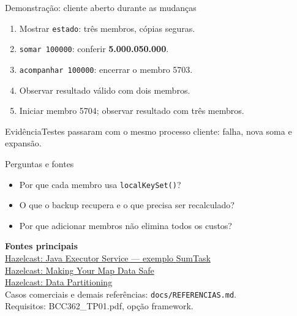 \documentclass[aspectratio=169,11pt]{beamer}
\begin{document}
\begin{frame}{Demonstração: cliente aberto durante as mudanças}
\begin{enumerate}\setlength\itemsep{0.2cm}
\item Mostrar \texttt{estado}: três membros, cópias seguras.
\item \texttt{somar 100000}: conferir \textbf{5.000.050.000}.
\item \texttt{acompanhar 100000}: encerrar o membro 5703.
\item Observar resultado válido com dois membros.
\item Iniciar membro 5704; observar resultado com três membros.
\end{enumerate}
\begin{block}{Evidência}Testes passaram com o mesmo processo cliente: falha, nova soma e expansão.\end{block}
\end{frame}

\begin{frame}{Perguntas e fontes}
\begin{itemize}\setlength\itemsep{0.15cm}
\item Por que cada membro usa \texttt{localKeySet()}?
\item O que o backup recupera e o que precisa ser recalculado?
\item Por que adicionar membros não elimina todos os custos?
\end{itemize}
\vspace{0.3cm}\small\textbf{Fontes principais}\\[0.1cm]
\href{https://docs.hazelcast.com/hazelcast/5.6/computing/executor-service}{Hazelcast: Java Executor Service --- exemplo SumTask}\\
\href{https://docs.hazelcast.com/hazelcast/5.6/data-structures/backing-up-maps}{Hazelcast: Making Your Map Data Safe}\\
\href{https://docs.hazelcast.com/hazelcast/5.0/overview/data-partitioning}{Hazelcast: Data Partitioning}\\[0.15cm]
Casos comerciais e demais referências: \texttt{docs/REFERENCIAS.md}.\\
Requisitos: BCC362\_TP01.pdf, opção framework.
\end{frame}
\end{document}
